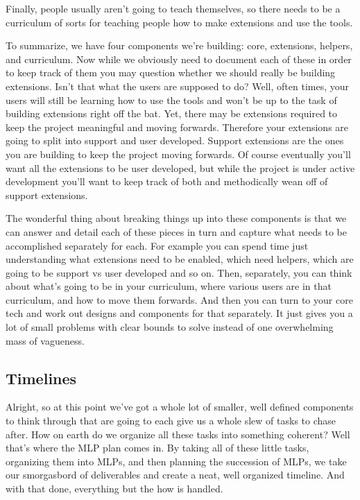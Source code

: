 \documentclass[10pt,a5paper]{book}
\begin{document}
Finally, people usually aren't going to teach themselves, so there needs to be a curriculum of sorts for teaching people how to make extensions and use the tools. 

To summarize, we have four components we're building: core, extensions, helpers, and curriculum. Now while we obviously need to document each of these in order to keep track of them you may question whether we should really be building extensions. Isn't that what the users are supposed to do? Well, often times, your users will still be learning how to use the tools and won't be up to the task of building extensions right off the bat. Yet, there may be extensions required to keep the project meaningful and moving forwards. Therefore your extensions are going to split into support and user developed. Support extensions are the ones you are building to keep the project moving forwards. Of course eventually you'll want all the extensions to be user developed, but while the project is under active development you'll want to keep track of both and methodically wean off of support extensions. 

The wonderful thing about breaking things up into these components is that we can answer and detail each of these pieces in turn and capture what needs to be accomplished separately for each. For example you can spend time just understanding what extensions need to be enabled, which need helpers, which are going to be support vs user developed and so on. Then, separately, you can think about what's going to be in your curriculum, where various users are in that curriculum, and how to move them forwards. And then you can turn to your core tech and work out designs and components for that separately. It just gives you a lot of small problems with clear bounds to solve instead of one overwhelming mass of vagueness. 

\subsection{Timelines}
Alright, so at this point we've got a whole lot of smaller, well defined components to think through that are going to each give us a whole slew of tasks to chase after. How on earth do we organize all these tasks into something coherent? Well that's where the MLP plan comes in. By taking all of these little tasks, organizing them into MLPs, and then planning the succession of MLPs, we take our smorgasbord of deliverables and create a neat, well organized timeline. And with that done, everything but the how is handled.
\end{document}
